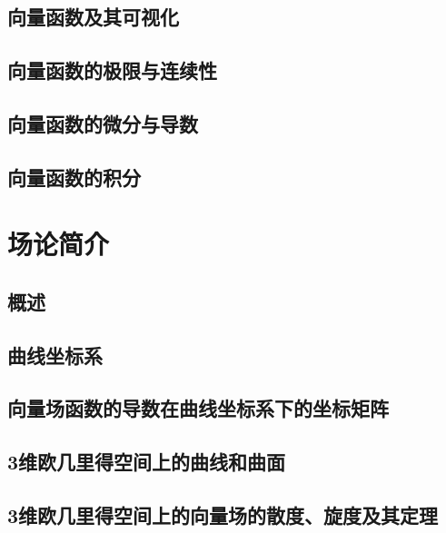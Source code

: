 \documentclass[zihao=-4,linespread=1.5,a4paper,heading=true,twoside]{ctexbook}
\theoremstyle{definition}
\theoremstyle{plain}
\begin{document}
\section{向量函数及其可视化}\label{sec:II.4.1}


\section{向量函数的极限与连续性}\label{sec:II.4.2}


\section{向量函数的微分与导数}\label{sec:II.4.3}


\section{向量函数的积分}\label{sec:II.4.4}


\chapter{场论简介}\label{sec:II.5}
\section{概述}\label{sec:II.5.1}


\section{曲线坐标系}\label{sec:II.5.2}


\section{向量场函数的导数在曲线坐标系下的坐标矩阵}\label{sec:II.5.3}


\section{3维欧几里得空间上的曲线和曲面}\label{sec:II.5.4}


\section{3维欧几里得空间上的向量场的散度、旋度及其定理}
\end{document}
